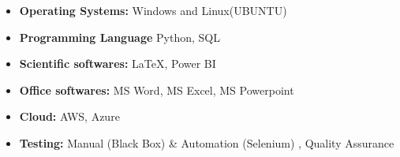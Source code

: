 \documentclass[11pt,a4paper]{moderncv}
\begin{document}
\begin{itemize}
	
	\item \textbf{Operating Systems:} Windows and Linux(UBUNTU)
	
	\item \textbf{Programming Language} Python, SQL %
	
	\item \textbf{Scientific softwares:} \LaTeX, Power BI%
	\item \textbf{Office softwares:} MS Word, MS Excel, MS Powerpoint 
	
	\item \textbf{Cloud:} AWS, Azure
	
	\item \textbf{Testing:} Manual (Black Box) \& Automation (Selenium) , Quality Assurance
	
\end{itemize}
	
%
%	
%	
%	
%	
\end{document}
